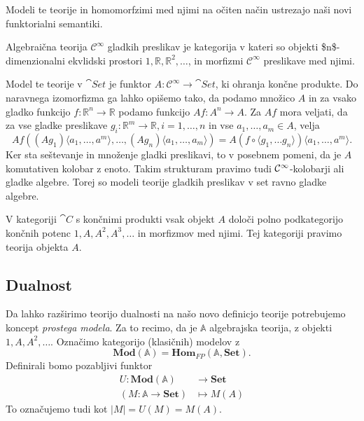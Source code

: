 \documentclass[../kategoricna_logika.tex]{subfiles}
\begin{document}
Modeli te teorije in homomorfzimi med njimi na očiten način ustrezajo naši novi
funktorialni semantiki.
\begin{primer}
Algebraična teorija \(\mathcal{C}^{\infty}\) gladkih preslikav je kategorija
v kateri so objekti \$n\$-dimenzionalni ekvlidski prostori \(1, \mathbb{R}, \mathbb{R}^2, \ldots\),
in morfizmi \(\mathcal{C}^{\infty}\) preslikave med njimi.

Model te teorije v \(\cat{Set}\) je funktor \(A : \mathcal{C}^{\infty} \to \cat{Set}\),
ki ohranja končne produkte. Do naravnega izomorfizma ga lahko opišemo tako, da
podamo množico \(A\) in za vsako gladko funkcijo \(f : \mathbb{R}^n \to \mathbb{R}\)
podamo funkcijo \(Af : A^n \to A\). Za \(Af\) mora veljati, da za vse gladke preslikave
\(g_i : \mathbb{R}^m \to \mathbb{R}, i = 1, \ldots, n\) in vse \(a_1, \ldots, a_m \in A\),
velja
\[ 
   Af \left( (Ag_1)\langle a_1, \ldots, a^m \rangle, \ldots, (Ag_n)\langle a_1, \ldots, a_m \rangle \right) =
   A(f \circ \langle g_1, \ldots g_n \rangle)\langle a_1, \ldots, a^m \rangle.
\]
Ker sta seštevanje in množenje gladki preslikavi, to v posebnem pomeni,
da je \(A\) komutativen kolobar z enoto.
Takim strukturam pravimo tudi $\mathcal{C}\textsuperscript{\(\infty\)}$-kolobarji
ali gladke algebre. Torej so modeli teorije gladkih preslikav v set ravno gladke algebre.
\end{primer}
%
\begin{primer}
V kategoriji \(\cat{C}\) s končnimi produkti vsak objekt \(A\) določi polno podkategorijo
končnih potenc \(1, A, A^2, A^3, \ldots\) in morfizmov med njimi. Tej kategoriji
pravimo teorija objekta \(A\).
\end{primer}
\subsection{Dualnost}
\label{sec:orgef98ac4}
Da lahko razširimo teorijo dualnosti na našo novo definicjo teorije potrebujemo
koncept \emph{prostega modela}. Za to recimo, da je \(\mathbb{A}\) algebrajska teorija,
z objekti \(1, A, A^2, \ldots\). Označimo kategorijo (klasičnih) modelov z
\[ \mathbf{Mod}(\mathbb{A}) = \mathbf{Hom}_{FP}(\mathbb{A}, \mathbf{Set}). \]
Definirali bomo pozabljivi funktor
\begin{align*}
U : \mathbf{Mod}(\mathbb{A}) &\to \mathbf{Set} \\
(M : \mathbb{A} \to \mathbf{Set}) &\mapsto M(A)
\end{align*}
To označujemo tudi kot \(|M| = U(M) = M(A)\).
\end{document}
